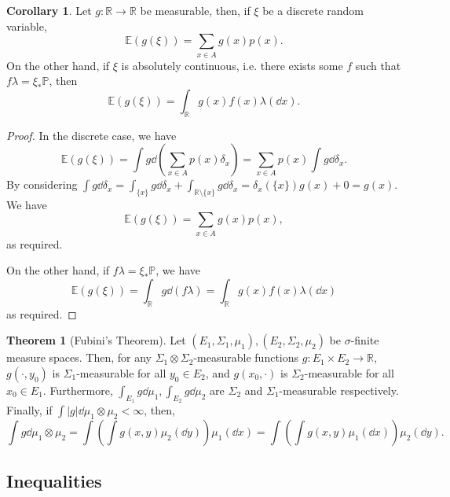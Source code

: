 \documentclass[]{article}
\theoremstyle{definition}
\newtheorem{theorem}{Theorem}
\newtheorem{corollary}{Corollary}[theorem]
\theoremstyle{definition}
\begin{document}
\begin{corollary}
  Let \(g : \mathbb{R} \to \mathbb{R}\) be measurable, then, if 
  \(\xi\) be a discrete random variable, 
  \[\mathbb{E}(g(\xi)) = \sum_{x \in A}g(x) p(x).\]
  On the other hand, if \(\xi\) is absolutely continuous, i.e. there exists 
  some \(f\) such that \(f\lambda = \xi_* \mathbb{P}\), then 
  \[\mathbb{E}(g(\xi)) = \int_{\mathbb{R}}g(x)f(x) \lambda(\dd x).\]
\end{corollary}
\begin{proof}
  In the discrete case, we have 
  \[\mathbb{E}(g(\xi)) = \int g \dd \left(\sum_{x \in A}p(x) \delta_x\right) = 
    \sum_{x \in A} p(x) \int g \dd \delta_x.\]
  By considering \(\int g \dd \delta_x = \int_{\{x\}} g \dd \delta_x + 
  \int_{\mathbb{R} \setminus \{x\}} g \dd \delta_x = \delta_x(\{x\})g(x) + 0 = g(x)\).
  We have 
  \[\mathbb{E}(g(\xi)) = \sum_{x \in A}g(x) p(x),\]
  as required.

  On the other hand, if \(f\lambda = \xi_* \mathbb{P}\), we have
  \[\mathbb{E}(g(\xi)) = \int_{\mathbb{R}} g \dd (f \lambda) = \int_{\mathbb{R}} g(x)f(x) \lambda(\dd x)\]
  as required.
\end{proof}

\begin{theorem}[Fubini's Theorem]
  Let \((E_1, \Sigma_1, \mu_1), (E_2, \Sigma_2, \mu_2)\) be \(\sigma\)-finite 
  measure spaces. Then, for any \(\Sigma_1 \otimes \Sigma_2\)-measurable 
  functions \(g : E_1 \times E_2 \to \mathbb{R}\), \(g(\cdot, y_0)\) is 
  \(\Sigma_1\)-measurable for all \(y_0 \in E_2\), and \(g(x_0, \cdot)\) is 
  \(\Sigma_2\)-measurable for all \(x_0 \in E_1\). Furthermore, 
  \(\int_{E_1} g \dd \mu_1, \int_{E_2} g \dd \mu_2\) are \(\Sigma_2\) and \(\Sigma_1\)-measurable 
  respectively. Finally, if \(\int |g| \dd \mu_1 \otimes \mu_2 < \infty\),
  then, 
  \[\int g \dd \mu_1 \otimes \mu_2 = \int \left(\int g(x, y) \mu_2(\dd y)\right) \mu_1(\dd x) 
   = \int \left(\int g(x, y) \mu_1(\dd x)\right) \mu_2(\dd y).\]
\end{theorem}

\subsection{Inequalities}
\end{document}
